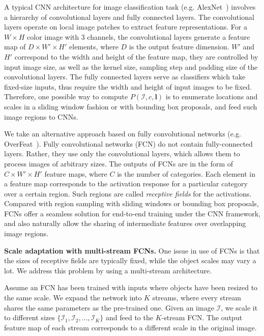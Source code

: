 \documentclass[10pt,twocolumn,letterpaper]{article}
\begin{document}
A typical CNN architecture for image classification task (e.g. AlexNet~\cite{NIPS2012_4824}) involves a hierarchy of convolutional layers and fully connected layers. The convolutional layers operate on local image patches to extract feature representations. For a $W \times H$ color image with 3 channels, the convolutional layers generate a feature map of $D\times W' \times H'$ elements, where $D$ is the output feature dimension. $W'$ and $H'$ correspond to the width and height of the feature map, they are controlled by input image size, as well as the kernel size, sampling step and padding size of the convolutional layers. The fully connected layers serve as classifiers which take fixed-size inputs, thus require the width and height of input images to be fixed. Therefore, one possible way to compute $P(\mathcal{I}, c, \mathbf{l})$ is to enumerate locations and scales in a sliding window fashion or with bounding box proposals, and feed such image regions to CNNs.

We take an alternative approach based on fully convolutional networks (e.g. OverFeat~\cite{DBLP:journals/corr/SermanetEZMFL13}). Fully convolutional networks (FCN) do not contain fully-connected layers. Rather, they use only the convolutional layers, which allows them to process images of arbitrary sizes. The outputs of FCNs are in the form of $C\times W' \times H'$ feature maps, where $C$ is the number of categories. Each element in a feature map corresponds to the activation response for a particular category over a certain region. Such regions are called \textit{receptive fields} for the activations. Compared with region sampling with sliding windows or bounding box proposals, FCNs offer a seamless solution for end-to-end training under the CNN framework, and also naturally allow the sharing of intermediate features over overlapping image regions.

\textbf{Scale adaptation with multi-stream FCNs.} One issue in use of FCNs is that the sizes of receptive fields are typically fixed, while the object scales may vary a lot. We address this problem by using a multi-stream architecture. 

Assume an FCN has been trained with inputs where objects have been resized to the same scale. We expand the network into $K$ streams, where every stream shares the same parameters as the pre-trained one. Given an image $\mathcal{I}$, we scale it to different sizes $\{\mathcal{I}_1, \mathcal{I}_2, ..., \mathcal{I}_K\}$ and feed to the $K$-stream FCN. The output feature map of each stream corresponds to a different scale in the original image.
\end{document}
